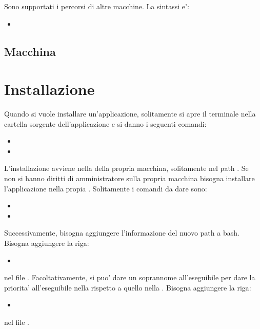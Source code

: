 Sono supportati i percorsi di altre macchine. La sintassi e':
\begin{itemize}
\item[] 
\end{itemize}

\subsection{Macchina}


\section{Installazione}

Quando si vuole installare un'applicazione, solitamente si apre il terminale nella cartella sorgente dell'applicazione e si danno i seguenti comandi:
\begin{itemize}
\item[\bbox] 
\item[\bbox] 
\end{itemize}
L'installazione avviene nella  della propria macchina, solitamente nel path . Se non si hanno diritti di amministratore sulla propria macchina bisogna installare l'applicazione nella propia . Solitamente i comandi da dare sono:
\begin{itemize}
\item[\bbox] 
\item[\bbox] 
\end{itemize}
Successivamente, bisogna aggiungere l'informazione del nuovo path a bash. Bisogna aggiungere la riga:
\begin{itemize}
\item[] 
\end{itemize}
nel file . Facoltativamente, si puo' dare un soprannome all'eseguibile per dare la priorita' all'eseguibile nella  rispetto a quello nella . Bisogna aggiungere la riga:
\begin{itemize}
\item[] 
\end{itemize}
nel file .

